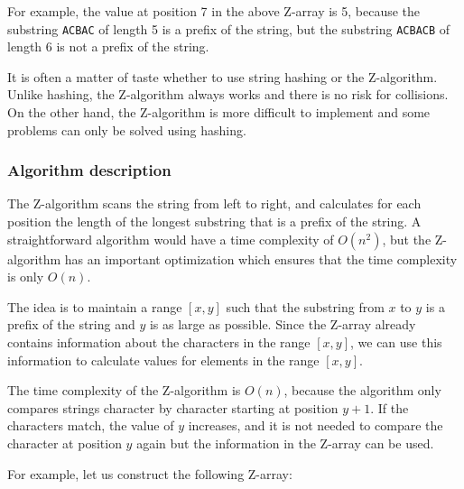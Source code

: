 For example, the value at position 7 in the
above Z-array is 5,
because the substring \texttt{ACBAC} of length 5
is a prefix of the string,
but the substring \texttt{ACBACB} of length 6
is not a prefix of the string.

It is often a matter of taste whether to use
string hashing or the Z-algorithm.
Unlike hashing, the Z-algorithm always works
and there is no risk for collisions.
On the other hand, the Z-algorithm is more difficult
to implement and some problems can only be solved
using hashing.

\subsubsection*{Algorithm description}

The Z-algorithm scans the string from left
to right, and calculates for each position
the length of the longest substring that
is a prefix of the string.
A straightforward algorithm
would have a time complexity of $O(n^2)$,
but the Z-algorithm has an important
optimization which ensures that the time complexity
is only $O(n)$.

The idea is to maintain a range $[x,y]$ such that
the substring from $x$ to $y$ is a prefix of
the string and $y$ is as large as possible.
Since the Z-array already contains information
about the characters in the range $[x,y]$,
we can use this information to calculate
values for elements in the range $[x,y]$.

The time complexity of the Z-algorithm is $O(n)$,
because the algorithm only compares strings
character by character starting at position $y+1$.
If the characters match, the value of $y$ increases,
and it is not needed to compare the character at
position $y$ again
but the information in the Z-array can be used.

For example, let us construct the following Z-array:

